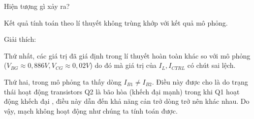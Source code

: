 Hiện tượng gì xảy ra?

Kết quả tính toán theo lí thuyết không trùng khớp với kết quả mô phỏng.

Giải thích:

Thứ nhất, các giá trị đã giá định trong lí thuyết hoàn toàn khác so với mô phỏng (\(V_{BG} \approx 0,886 V, V_{CG} \approx 0,02 V\)) do đó mà giá trị của \(I_L, I_{CTRL}\) có chút sai lệch.

Thứ hai, trong mô phỏng ta thấy dòng \(I_{B1} \neq I_{B2}\). Điều này được cho là do trạng thái hoạt động transistors Q2 là bão hòa (khếch đại mạnh) trong khi Q1 hoạt động khếch đại , điều này dẫn đến khả năng cản trở dòng 
trở nên khác nhau. Do vậy, mạch không hoạt động như chúng ta tính toán được.

\pagebreak


 